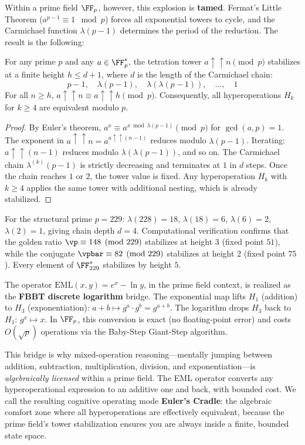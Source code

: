 Within a prime field $\FF_p$, however, this explosion is \textbf{tamed}. Fermat's Little Theorem ($a^{p-1} \equiv 1 \mod p$) forces all exponential towers to cycle, and the Carmichael function $\lambda(p-1)$ determines the period of the reduction. The result is the following:

\begin{theorem}\label{thm:tetration-ceiling}
For any prime $p$ and any $a \in \FF_p^*$, the tetration tower $a \uparrow\uparrow n \pmod{p}$ stabilizes at a finite height $h \leq d + 1$, where $d$ is the length of the Carmichael chain:
$$p-1, \quad \lambda(p-1), \quad \lambda(\lambda(p-1)), \quad \ldots, \quad 1$$
For all $n \geq h$, $a \uparrow\uparrow n \equiv a \uparrow\uparrow h \pmod{p}$. Consequently, all hyperoperations $H_k$ for $k \geq 4$ are equivalent modulo $p$.
\end{theorem}

\begin{proof}
By Euler's theorem, $a^x \equiv a^{x \bmod \lambda(p-1)} \pmod{p}$ for $\gcd(a, p) = 1$. The exponent in $a \uparrow\uparrow n = a^{a \uparrow\uparrow (n-1)}$ reduces modulo $\lambda(p-1)$. Iterating: $a \uparrow\uparrow (n-1)$ reduces modulo $\lambda(\lambda(p-1))$, and so on. The Carmichael chain $\lambda^{(k)}(p-1)$ is strictly decreasing and terminates at $1$ in $d$ steps. Once the chain reaches $1$ or $2$, the tower value is fixed. Any hyperoperation $H_k$ with $k \geq 4$ applies the same tower with additional nesting, which is already stabilized. \qedhere
\end{proof}

For the structural prime $p = 229$: $\lambda(228) = 18$, $\lambda(18) = 6$, $\lambda(6) = 2$, $\lambda(2) = 1$, giving chain depth $d = 4$. Computational verification confirms that the golden ratio $\vp \equiv 148 \pmod{229}$ stabilizes at height $3$ (fixed point $51$), while the conjugate $\vpbar \equiv 82 \pmod{229}$ stabilizes at height $2$ (fixed point $75$). Every element of $\FF_{229}^*$ stabilizes by height $5$.

\begin{remark}\label{rem:eml}
The operator $\mathrm{EML}(x, y) = e^x - \ln y$, in the prime field context, is realized as the \textbf{FBBT discrete logarithm} bridge. The exponential map lifts $H_1$ (addition) to $H_3$ (exponentiation): $a + b \mapsto g^a \cdot g^b = g^{a+b}$. The logarithm drops $H_3$ back to $H_1$: $g^x \mapsto x$. In $\FF_p$, this conversion is exact (no floating-point error) and costs $O(\sqrt{p})$ operations via the Baby-Step Giant-Step algorithm.

This bridge is why mixed-operation reasoning---mentally jumping between addition, subtraction, multiplication, division, and exponentiation---is \emph{algebraically licensed} within a prime field. The EML operator converts any hyperoperational expression to an additive one and back, with bounded cost. We call the resulting cognitive operating mode \textbf{Euler's Cradle}: the algebraic comfort zone where all hyperoperations are effectively equivalent, because the prime field's tower stabilization ensures you are always inside a finite, bounded state space.
\end{remark}

